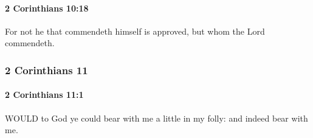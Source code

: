 		\paragraph{2 Corinthians 10:18} %
			\label{2CORINTHIANS-10-18}

			For not he that commendeth himself is approved, but whom the Lord commendeth.

			\begin{framed}
			\scriptsize
				\begin{compactdesc}
					\item[SBLG] 
				\end{compactdesc}
			\end{framed}

	\subsubsection{2 Corinthians 11} %
		\label{2CORINTHIANS-11}
		
		\paragraph{2 Corinthians 11:1} %
			\label{2CORINTHIANS-11-1}

			WOULD to God ye could bear with me a little in my folly: and indeed bear with me.

